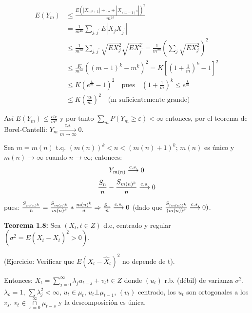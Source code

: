 \begin{align*}
E(Y_{m}) &\leq \frac{E\left(\left|X_{m^{k}+1}\right|+\ldots+\left|X_{(m-1)^k} \right| \right)^2}{m^{2k}}\\
         &= \frac{1}{m^{2k}}\sum_{j,j^{'}} E\left|X_{j} X_{j^{'}} \right|\\
         &\leq \frac{1}{m^{2k}}\sum_{j,j^{'}} \sqrt{EX_{j}^{2}} \sqrt{EX_{j^{'}}^{2}} = \frac{1}{m^{2k}}\left(\sum_j \sqrt{EX_{j}^{2}} \right)^{2}\\
         &\leq \frac{K}{m^{2k}}\left((m+1)^{k}-m^{k} \right)^{2}=K\left[\left(1+\frac{1}{m} \right)^{k}-1\right]^{2}\\
         &\leq K\left(e^{\frac{k}{m}}-1 \right)^{2}\quad \text{pues}\quad \left(1+\frac{1}{m}\right)^{k}\leq e^{\frac{k}{m}}\\
         &\leq K\left(\frac{2k}{m}\right)^{2}\quad \text{(m suficientemente grande)}
\end{align*}

As\'{i} $E\left(Y_{m}\right)\leq \frac{cte}{m^2}$ y por tanto $\sum_m P(Y_{m}\geq \varepsilon) <\infty$ entonces, por el teorema de Borel-Cantelli: $Y_{m} \mathop \to\limits_{m\to \infty }^{c.s.} 0$.\newline

Sea $m=m(n)$ t.q. $\left(m(n) \right)^{k}<n<\left(m(n)+1 \right)^{k}$; $m(n)$ es \'{u}nico y $m(n)\to \infty$ cuando $n\to \infty$; entonces: 
\[
Y_{m\left( n \right)} \buildrel {c.s.} \over \longrightarrow 0
\]
\[
\frac{S_{n} }{n}-\frac{S_{m(n)^{k}}}{n}\buildrel {c.s.} \over \longrightarrow 0
\]

pues: $\frac{S_{m(n)^{k}}}{n}=\frac{S_{m(n)^{k}}}{m(n)^{k}}\ast \frac{m(n)^{k}}{n}\Rightarrow \frac{S_{n}}{n}\buildrel {c.s.} \over \longrightarrow 0$ (dado que $\frac{S_{(m(n))^{k}}}{(m(n))^{k}}\buildrel {c.s.} \over \longrightarrow 0)$.\newline

\textbf{Teorema 1.8:} Sea $(X_{t}, t\in Z)$ d.e, centrado y regular $\left(\sigma^{2}=E\left(X_{t} -\hat{X}_{t} \right)^{2}>0 \right)$.\newline

(Ejercicio: Verificar que $E\left(X_{t} -\hat{X}_{t} \right)^{2}$ no depende de t).\newline

Entonces: $X_{t} =\sum\limits_{j=0}^\infty \lambda_{j} u_{t-j} +v_{t} t\in Z$ donde $(u_{t})$ r.b. (d\'{e}bil) de varianza $\sigma^{2}$, $\lambda_{o} =1$, $\sum\lambda_{j}^{2} <\infty$, $u_{t} \in \mu_{t}$, $u_{t} \bot \mu_{t-1}$, $\left(v_{t} \right)$ centrado, los $u_{t}$ son ortogonales a los $v_{s}$, $v_{t} \in \mathop \cap\limits_{s=0}^{\infty } \mu_{t-s}$ y la descomposici\'{o}n es \'{u}nica.\newline

